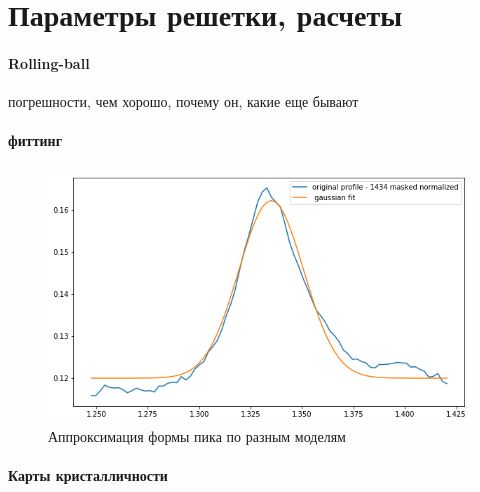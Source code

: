 	\section{Параметры решетки, расчеты}
	
	
	\paragraph{Rolling-ball}
	погрешности, чем хорошо, почему он, какие еще бывают
	


    \paragraph{фиттинг}

\begin{figure}
    \centering
    \includegraphics[width=\linewidth]{fig/gauss-fit.png}
    \caption{Аппроксимация формы пика по разным моделям}
    \label{fig:my_label}
\end{figure}
	
	\paragraph{Карты кристалличности}
	
